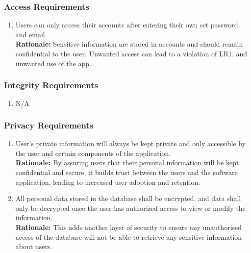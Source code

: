 \documentclass[]{article}
\begin{document}
\subsubsection{Access Requirements}
\label{ssub:access_requirements}
\begin{enumerate}[{SR-AC}1. ]
	\item Users can only access their accounts after entering their own set password and email.\\
	{\bf Rationale:} Sensitive information are stored in accounts and should remain confidential to the user. Unwanted access can lead to a violation of LR1. and unwanted use of the app. 
\end{enumerate}

\subsubsection{Integrity Requirements}
\label{ssub:integrity_requirements}
\begin{enumerate}[{SR-INT}1. ]
	\item N/A
\end{enumerate}

\subsubsection{Privacy Requirements}
\label{ssub:privacy_requirements}
\begin{enumerate}[{SR-P}1. ]
	\item User's private information will always be kept private and only accessible by the user and certain components of the application.\\
	{\bf Rationale:} By assuring users that their personal information will be kept confidential and secure, it builds trust between the users and the software application, leading to increased user adoption and retention. 
	\item All personal data stored in the database shall be encrypted, and data shall only be decrypted once the user has authorized access to view or modify the information.\\
	{\bf Rationale:} This adds another layer of security to ensure any unauthorised access of the database will not be able to retrieve any sensitive information about users. 
\end{enumerate}
\end{document}
